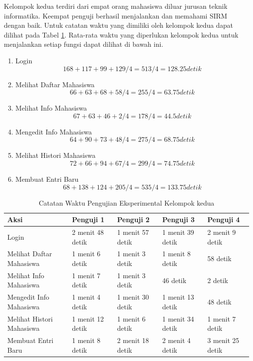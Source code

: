 Kelompok kedua terdiri dari empat orang mahasiswa diluar jurusan teknik
informatika. Keempat penguji berhasil menjalankan dan memahami SIRM dengan baik.
Untuk catatan waktu yang dimiliki oleh kelompok kedua dapat dilihat pada Tabel
\ref{tab:catatanwaktukelompokkedua}. Rata-rata waktu yang diperlukan
kelompok kedua untuk menjalankan setiap fungsi dapat dilihat di bawah ini.
\begin{enumerate}[(1)]
  \item Login\\
  $$168 + 117 + 99 + 129 / 4 = 513 / 4 = 128.25 detik$$
  \item Melihat Daftar Mahasiswa
  $$66 + 63 + 68 + 58 / 4 = 255 / 4 = 63.75 detik$$
  \item Melihat Info Mahasiswa
  $$67 + 63 + 46 + 2 / 4 = 178 / 4 = 44.5 detik$$
  \item Mengedit Info Mahasiswa
  $$64 + 90 + 73 + 48 / 4 = 275 / 4 = 68.75 detik$$
  \item Melihat Histori Mahasiswa
  $$72 + 66 + 94 + 67 / 4 = 299 / 4 = 74.75 detik$$
  \item Membuat Entri Baru
  $$68 + 138 + 124 + 205 / 4 = 535 / 4 = 133.75 detik$$
\end{enumerate}

\begin{table}[h]
\centering
\caption[Tabel Catatan Waktu Pengujian Eksperimental Kelompok
Kedua]{Catatan Waktu Pengujian Eksperimental Kelompok kedua}
\label{tab:catatanwaktukelompokkedua}
\begin{tabular}{|p{3cm}|p{1.8cm}|p{1.8cm}|p{1.8cm}|p{1.8cm}|}
\hline
Aksi & Penguji 1 & Penguji 2 & Penguji 3 & Penguji 4\\
\hline
Login & 2 menit 48 detik & 1 menit 57 detik & 1 menit 39 detik & 2 menit 9
detik\\
\hline
Melihat Daftar Mahasiswa & 1 menit 6 detik & 1 menit 3 detik & 1 menit 8 detik &
58 detik\\
\hline
Melihat Info Mahasiswa & 1 menit 7 detik & 1 menit 3 detik & 46 detik & 2
detik\\
\hline
Mengedit Info Mahasiswa & 1 menit 4 detik & 1 menit 30 detik & 1 menit 13 detik
& 48 detik\\
\hline
Melihat Histori Mahasiswa & 1 menit 12 detik & 1 menit 6 detik & 1 menit 34
detik & 1 menit 7 detik\\
\hline
Membuat Entri Baru & 1 menit 8 detik & 2 menit 18 detik & 2 menit 4 detik & 3
menit 25 detik\\
\hline
\end{tabular}
\end{table}

